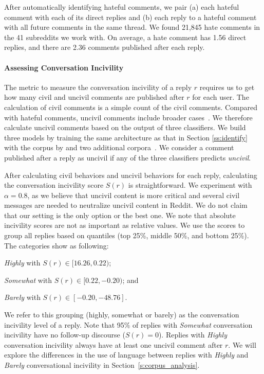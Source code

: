 \documentclass[11pt]{article}
\begin{document}
	After automatically identifying hateful comments, we pair
	(a) each hateful comment with each of its direct replies
	and
	(b) each reply to a hateful comment with all future comments in the same thread.
	We found 21,845  hate comments in the 41 subreddits we work with.
	On average, a hate comment has 1.56 direct replies,
	and there are 2.36 comments published after each reply.

	
	\paragraph{Assessing Conversation Incivility}
	\label{ss:assess}
	The metric to measure the conversation incivility of a reply $r$ requires us to get
	how many civil and uncivil comments are published after $r$ for each user.
	The calculation of civil comments is a simple count of the civil comments.
	Compared with hateful comments, uncivil comments include broader cases~\cite{davidson-etal-2020-developing}.
	We therefore calculate uncivil comments based on the output of three classifiers.
	We build three models by training the same architecture as that in Section \ref{ss:identify} with the corpus by \citet{qian-etal-2019-benchmark}
	and two additional corpora~\cite{hateoffensive,vidgen-etal-2021-introducing}.
	We consider a comment published after a reply as uncivil if any of the three classifiers predicts \emph{uncivil}. 
	
	After calculating civil behaviors and uncivil behaviors for each reply,
	calculating the conversation incivility score $S(r)$ is straightforward.
	We experiment with $\alpha = 0.8$, 
	as we believe that uncivil content is more critical and several civil messages are needed to neutralize uncivil content in Reddit.
	We do not claim that our setting is the only option or the best one. 
	We note that absolute incivility scores are not as important as relative values.
	We use the scores to group all replies based on quantiles (top 25\%, middle 50\%, and bottom 25\%). 
	The categories show as following:
	\begin{compactitem}
		\item \emph{Highly} with $ S(r) \in [16.26,0.22) $;
		\item \emph{Somewhat} with $ S(r) \in [0.22, -0.20) $; and
		\item \emph{Barely} with  $ S(r) \in [-0.20, -48.76]$.
	\end{compactitem}

	We refer to this grouping (highly, somewhat or barely) as the conversation incivility level of a reply.
	Note that 95\% of replies with \emph{Somewhat} conversation incivility have no follow-up discourse ($S(r)=0$).   
	Replies with \emph{Highly} conversation incivility always have at least one uncivil comment after $r$.
	We will explore the differences in the use of language between replies with \emph{Highly} and \emph{Barely} conversational incivility in Section~\ref{s:corpus_analysis}.
	
\end{document}
